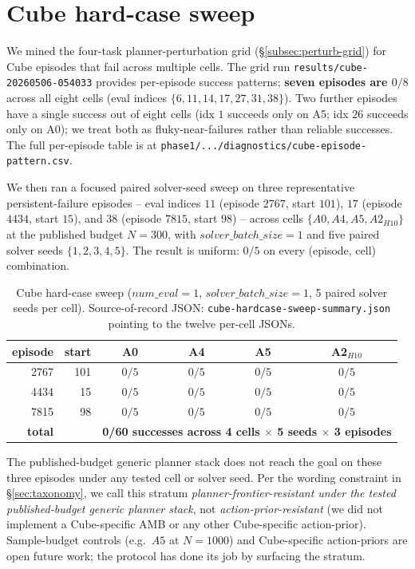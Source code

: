 \documentclass{article}
\begin{document}
\section{Cube hard-case sweep}
\label{app:cube-hardcase}

We mined the four-task planner-perturbation grid (\S\ref{subsec:perturb-grid}) for Cube episodes that fail across multiple cells. The grid run \texttt{results/cube-20260506-054033} provides per-episode success patterns; \textbf{seven episodes are $0/8$} across all eight cells (eval indices $\{6, 11, 14, 17, 27, 31, 38\}$). Two further episodes have a single success out of eight cells (idx $1$ succeeds only on A5; idx $26$ succeeds only on A0); we treat both as fluky-near-failures rather than reliable successes. The full per-episode table is at \texttt{phase1/.../diagnostics/cube-episode-pattern.csv}.

We then ran a focused paired solver-seed sweep on three representative persistent-failure episodes -- eval indices $11$ (episode $2767$, start $101$), $17$ (episode $4434$, start $15$), and $38$ (episode $7815$, start $98$) -- across cells $\{A0, A4, A5, A2_{H10}\}$ at the published budget $N{=}300$, with $\mathit{solver\_batch\_size}=1$ and five paired solver seeds $\{1, 2, 3, 4, 5\}$. The result is uniform: $0/5$ on every (episode, cell) combination.

\begin{table}[ht]
\centering\small
\caption{Cube hard-case sweep ($\mathit{num\_eval}=1$, $\mathit{solver\_batch\_size}=1$, 5 paired solver seeds per cell). Source-of-record JSON: \texttt{cube-hardcase-sweep-summary.json} pointing to the twelve per-cell JSONs.}
\label{tab:cube-hardcase}
\begin{tabular}{rrcccc}
\toprule
episode & start & A0 & A4 & A5 & A2$_{H10}$ \\
\midrule
2767  & 101 & $0/5$ & $0/5$ & $0/5$ & $0/5$ \\
4434  & 15  & $0/5$ & $0/5$ & $0/5$ & $0/5$ \\
7815  & 98  & $0/5$ & $0/5$ & $0/5$ & $0/5$ \\
\midrule
\textbf{total} & & \multicolumn{4}{c}{\textbf{0/60 successes across 4 cells $\times$ 5 seeds $\times$ 3 episodes}} \\
\bottomrule
\end{tabular}
\end{table}

The published-budget generic planner stack does not reach the goal on these three episodes under any tested cell or solver seed. Per the wording constraint in \S\ref{sec:taxonomy}, we call this stratum \emph{planner-frontier-resistant under the tested published-budget generic planner stack}, not \emph{action-prior-resistant} (we did not implement a Cube-specific AMB or any other Cube-specific action-prior). Sample-budget controls (e.g.\ $A5$ at $N{=}1000$) and Cube-specific action-priors are open future work; the protocol has done its job by surfacing the stratum.
\end{document}
